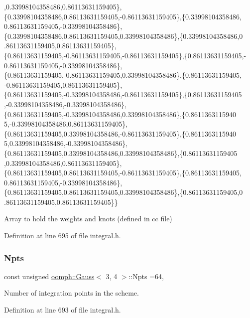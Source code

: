\begin{DoxyCode}
      ,0.33998104358486,0.86113631159405\},\{0.33998104358486,0.86113631159405,-0.86113631159405\},\{0.33998104358486,
      0.86113631159405,-0.33998104358486\},\{0.33998104358486,0.86113631159405,0.33998104358486\},\{0.33998104358486,0
      .86113631159405,0.86113631159405\},\{0.86113631159405,-0.86113631159405,-0.86113631159405\},\{0.86113631159405,-
      0.86113631159405,-0.33998104358486\},\{0.86113631159405,-0.86113631159405,0.33998104358486\},\{0.86113631159405,
      -0.86113631159405,0.86113631159405\},\{0.86113631159405,-0.33998104358486,-0.86113631159405\},\{0.86113631159405
      ,-0.33998104358486,-0.33998104358486\},\{0.86113631159405,-0.33998104358486,0.33998104358486\},\{0.8611363115940
      5,-0.33998104358486,0.86113631159405\},\{0.86113631159405,0.33998104358486,-0.86113631159405\},\{0.8611363115940
      5,0.33998104358486,-0.33998104358486\},\{0.86113631159405,0.33998104358486,0.33998104358486\},\{0.86113631159405
      ,0.33998104358486,0.86113631159405\},\{0.86113631159405,0.86113631159405,-0.86113631159405\},\{0.86113631159405,
      0.86113631159405,-0.33998104358486\},\{0.86113631159405,0.86113631159405,0.33998104358486\},\{0.86113631159405,0
      .86113631159405,0.86113631159405\}\}
\end{DoxyCode}


Array to hold the weights and knots (defined in cc file) 



Definition at line 695 of file integral.\+h.

\mbox{\label{classoomph_1_1Gauss_3_013_00_014_01_4_a359a6f461bc51c7abd755d36828e1c12}} 
\subsubsection{\texorpdfstring{Npts}{Npts}}
{\footnotesize\ttfamily const unsigned \hyperlink{classoomph_1_1Gauss}{oomph\+::\+Gauss}$<$ 3, 4 $>$\+::Npts =64\hspace{0.3cm}{\ttfamily [static]}, {\ttfamily [private]}}



Number of integration points in the scheme. 



Definition at line 693 of file integral.\+h.

